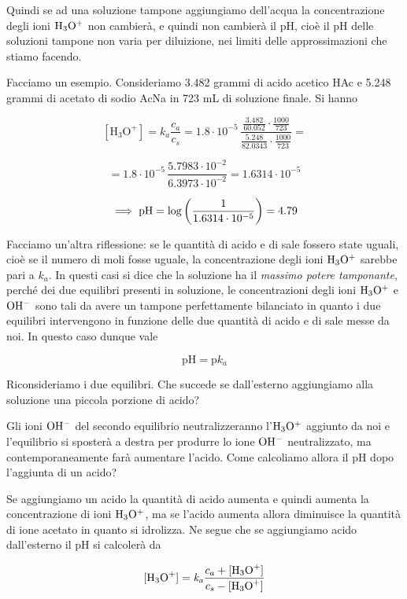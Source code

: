 Quindi se ad una soluzione tampone aggiungiamo dell'acqua la concentrazione degli ioni $\rm H_3O^+$ non cambierà, e quindi non cambierà il pH, cioè il pH delle soluzioni tampone non varia per diluizione, nei limiti delle approssimazioni che stiamo facendo.

\vspace{0.2cm}Facciamo un esempio. Consideriamo 3.482 grammi di acido acetico HAc e 5.248 grammi di acetato di sodio AcNa in 723 mL di soluzione finale. Si hanno

$$[\text{H}_3\text{O}^+]=k_a\frac{c_a}{c_s}
=1.8 \cdot 10^{-5}\,\frac{\frac{3.482}{60.052} \cdot \frac{1000}{723}}{\frac{5.248}{82.0343} \cdot \frac{1000}{723}}=$$

$$=1.8 \cdot 10^{-5}\,\frac{5.7983\cdot 10^{-2}}{6.3973\cdot 10^{-2}}=1.6314\cdot 10^{-5}$$

$$\implies \rm pH=\log\left( \frac{1}{1.6314\cdot 10^{-5}} \right)=4.79$$

Facciamo un'altra riflessione: se le quantità di acido e di sale fossero state uguali, cioè se il numero di moli fosse uguale, la concentrazione degli ioni $\rm H_3O^+$ sarebbe pari a $k_a$. In questi casi si dice che la soluzione ha il \textit{massimo potere tamponante}, perché dei due equilibri presenti in soluzione, le concentrazioni degli ioni $\rm H_3O^+$ e $\rm OH^-$ sono tali da avere un tampone perfettamente bilanciato in quanto i due equilibri intervengono in funzione delle due quantità di acido e di sale messe da noi. In questo caso dunque vale

$$\text{pH}=\text{p}k_a$$

Riconsideriamo i due equilibri. Che succede se dall'esterno aggiungiamo alla soluzione una piccola porzione di acido?

Gli ioni $\rm OH^-$ del secondo equilibrio neutralizzeranno l'$\rm H_3O^+$ aggiunto da noi e l'equilibrio si sposterà a destra per produrre lo ione $\rm OH^-$ neutralizzato, ma contemporaneamente farà aumentare l'acido. Come calcoliamo allora il pH dopo l'aggiunta di un acido?

Se aggiungiamo un acido la quantità di acido aumenta e quindi aumenta la concentrazione di ioni $\rm H_3O^+$, ma se l'acido aumenta allora diminuisce la quantità di ione acetato in quanto si idrolizza. Ne segue che se aggiungiamo acido dall'esterno il pH si calcolerà da

$${[\text{H}_3\text{O}^+]}=\textit{k}_\textit{a} \frac{c_a + \rm{[\text{H}_3\text{O}^+]}}{c_s - \rm{[\text{H}_3\text{O}^+]}}$$

